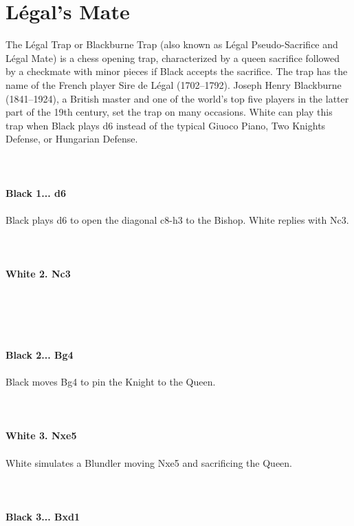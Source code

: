 \documentclass{article}
\begin{document}
\section{ Légal's Mate}

The Légal Trap or Blackburne Trap (also known as Légal Pseudo-Sacrifice and Légal Mate) is a chess opening trap, characterized by a queen sacrifice followed by a checkmate with minor pieces if Black accepts the sacrifice. The trap has the name of the French player Sire de Légal (1702–1792). Joseph Henry Blackburne (1841–1924), a British master and one of the world's top five players in the latter part of the 19th century, set the trap on many occasions. White can play this trap when Black plays d6 instead of the typical Giuoco Piano, Two Knights Defense, or Hungarian Defense.\\
\\

\\
\\
\textbf{Black 1... d6}\\
\\
Black plays d6 to open the diagonal c8-h3 to the Bishop. White replies with Nc3.\\
\\

\\
\\
\textbf{White 2. Nc3}\\
\\
\\
\\

\\
\\
\textbf{Black 2... Bg4}\\
\\
Black moves Bg4 to pin the Knight to the Queen.\\
\\

\\
\\
\textbf{White 3. Nxe5}\\
\\
White simulates a Blundler moving Nxe5 and sacrificing the Queen.\\
\\

\\
\\
\textbf{Black 3... Bxd1}\\
\end{document}
